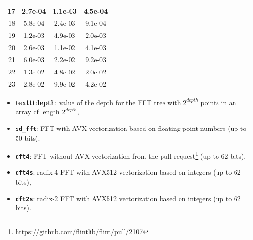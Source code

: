 \documentclass[10pt]{beamer}
\begin{document}
\begin{frame}
\begin{multicols}{2}
\begin{center}
{\begin{tabular}{|r|*{3}{c|}}
                \hline
                \cellcolor{myGray} 17 & 2.7e-04 & 1.1e-03 & 4.5e-04 \\
                \hline
                \cellcolor{myGray} 18 & 5.8e-04 & 2.4e-03 & 9.1e-04 \\
                \hline
                \cellcolor{myGray} 19 & 1.2e-03 & 4.9e-03 & 2.0e-03 \\
                \hline
                \cellcolor{myGray} 20 & 2.6e-03 & 1.1e-02 & 4.1e-03 \\
                \hline
                \cellcolor{myGray} 21 & 6.0e-03 & 2.2e-02 & 9.2e-03 \\
                \hline
                \cellcolor{myGray} 22 & 1.3e-02 & 4.8e-02 & 2.0e-02 \\
                \hline
                \cellcolor{myGray} 23 & 2.8e-02 & 9.9e-02 & 4.2e-02 \\
                \hline
            \end{tabular}
            }
        \end{center}
    \columnbreak

    \begin{itemize}
        \item \textbf{texttt{depth}}: value of the depth for the FFT tree with $2^{depth}$ points
        in an array of length $2^{depth}$,
        \item \textbf{\texttt{sd\_fft}}: FFT with AVX vectorization based on floating point numbers (up to 50 bits).
        \item \textbf{\texttt{dft4}}: FFT without AVX vectorization from the pull request\footnote{\url{https://github.com/flintlib/flint/pull/2107}} (up to 62 bits).    
        \item \textbf{\texttt{dft4s}}: radix-4 FFT with AVX512 vectorization based on integers (up to 62 bits),
        \item \textbf{\texttt{dft2s}}: radix-2 FFT with AVX512 vectorization based on integers (up to 62 bits).
    \end{itemize}
    \end{multicols}
\end{frame}
\end{document}
